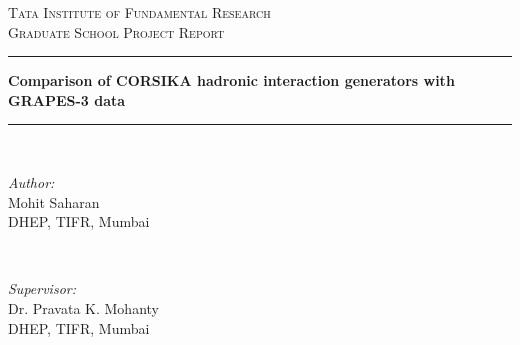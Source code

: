 \documentclass[12pt]{article}
\begin{document}
\begin{titlepage}

\newcommand{\HRule}{\rule{\linewidth}{0.5mm}} %

\center %
 

\textsc{\LARGE Tata Institute of Fundamental Research}\\[1.5cm] 
\textsc{\large Graduate School Project Report}\\[0.5cm] %
\vspace{3cm}

\HRule 
{ \huge \bfseries Comparison of CORSIKA hadronic interaction generators with  GRAPES-3 data\\} %
\HRule \\[3.0cm]
 

\vspace{4cm}

\begin{minipage}{0.4\textwidth}
\begin{flushleft} \large
\emph{Author:}\\
Mohit Saharan\\
DHEP, TIFR, Mumbai
\end{flushleft}
\end{minipage}
~
\begin{minipage}{0.4\textwidth}
\begin{flushright} \large
\emph{Supervisor:} \\
Dr. Pravata K. Mohanty\\
DHEP, TIFR, Mumbai
\end{flushright}
\end{minipage}\\[2cm]


\end{titlepage}
\end{document}
